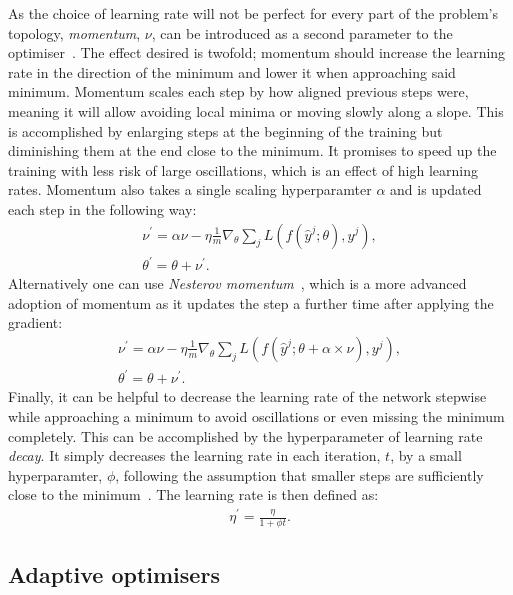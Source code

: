 As the choice of learning rate will not be perfect for every part of the problem's topology, \emph{momentum}, $\nu$, can be introduced as a second parameter to the optimiser~\cite{chollet2015keras}. The effect desired is twofold; momentum should increase the learning rate in the direction of the minimum and lower it when approaching said minimum. Momentum scales each step by how aligned previous steps were, meaning it will allow avoiding local minima or moving slowly along a slope. This is accomplished by enlarging steps at the beginning of the training but diminishing them at the end close to the minimum. It promises to speed up the training with less risk of large oscillations, which is an effect of high learning rates. Momentum also takes a single scaling hyperparamter $\alpha$ and is updated each step in the following way: 
%
\begin{align}
    \nu^{\prime} = \alpha \nu - \eta \frac{1}{m} \nabla_{\theta} \sum_j L(f(\hat{y}^j; \theta), y^j),\\
    \theta^{\prime} = \theta + \nu^{\prime}.
\end{align}
%
Alternatively one can use \emph{Nesterov momentum}~\cite{chollet2015keras}, which is a more advanced adoption of momentum as it updates the step a further time after applying the gradient: 
%
\begin{align}
    \nu^{\prime} = \alpha \nu - \eta \frac{1}{m} \nabla_{\theta} \sum_j L(f(\hat{y}^j; \theta + \alpha \times \nu), y^j),\\
    \theta^{\prime} = \theta + \nu^{\prime}.
\end{align}
%
Finally, it can be helpful to decrease the learning rate of the network stepwise while approaching a minimum to avoid oscillations or even missing the minimum completely. This can be accomplished by the hyperparameter of learning rate \emph{decay}. It simply decreases the learning rate in each iteration, $t$, by a small hyperparamter, $\phi$, following the assumption that smaller steps are sufficiently close to the minimum~\cite{chollet2015keras}. The learning rate is then defined as:
%
\begin{align}
    \eta^{\prime} = \frac{\eta}{1 + \phi t}.
\end{align}
%
\subsection{Adaptive optimisers}

